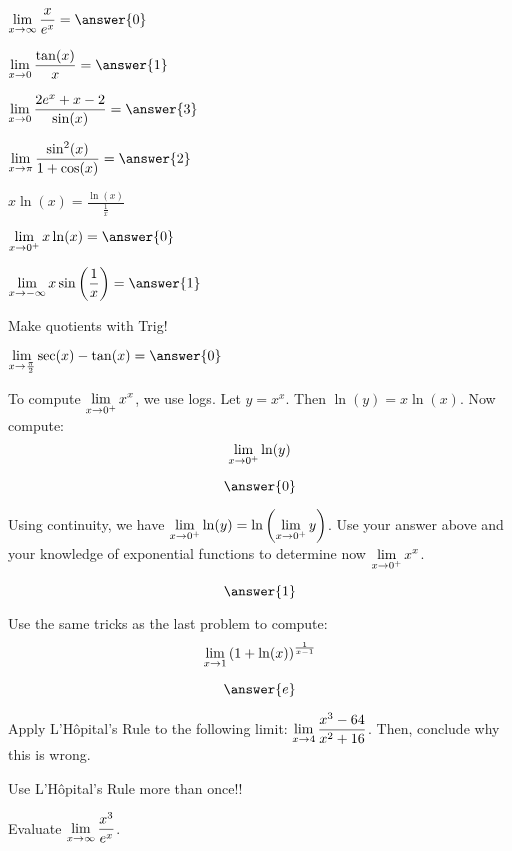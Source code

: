 \documentclass{ximera}
\begin{document}
    \begin{problem}
     $\dlim_{x \to \infty} \df{x}{e^x} = \answer{0}$
    \end{problem}
    \begin{problem}
     $\dlim_{x \to 0} \df{\tan(x)}{x} = \answer{1}$
    \end{problem}
    \begin{problem}
     $\dlim_{x \to 0} \df{2e^x + x - 2}{\sin(x)} = \answer{3}$
    \end{problem}
    \begin{problem}
     $\dlim_{x \to \pi} \df{\sin^2(x)}{1+\cos(x)} = \answer{2}$
    \end{problem}
    \begin{problem}
    \begin{hint}
    $x\ln(x) = \frac{\ln(x)}{\frac{1}{x}}$
    \end{hint}
    $\dlim_{x \to 0^+} x \ln(x) = \answer{0}$
    \end{problem}
    \begin{problem}
    $\dlim_{x \to -\infty} x\sin\left(\frac{1}{x}\right) = \answer{1}$
    \end{problem}
    \begin{problem}
    \begin{hint}
    Make quotients with Trig!
    \end{hint}
    $\dlim_{x \to \frac{\pi}{2}} \sec(x) - \tan(x) = \answer{0}$
    \end{problem}

    \begin{problem}
    To compute $\displaystyle \lim_{x \to 0^+} x^x$, we use logs. Let $y=x^x$. Then $\ln(y) = x \ln(x)$. Now compute:
    \[
        \displaystyle \lim_{x \to 0^+} \ln(y)
    \]


    $$\answer{0}$$


    Using continuity, we have $\displaystyle \lim_{x \to 0^+} \ln(y) = \ln\left(\displaystyle \lim_{x \to 0^+} y\right)$. Use your answer above and your knowledge of exponential functions to determine now $\displaystyle \lim_{x \to 0^+} x^x$.

    $$\answer{1}$$

    \end{problem}

    \begin{problem}
Use the same tricks as the last problem to compute:
        \[
            \displaystyle \lim_{x \to 1} \left(1+\ln(x)\right)^{\frac{1}{x-1}}
        \]

    $$\answer{e}$$
     \end{problem}

     \begin{problem}
     Apply L'H\^{o}pital's Rule to the following limit: $\displaystyle \lim_{x \to 4} \displaystyle\frac{x^3 - 64}{x^2+16}$. Then, conclude why this is wrong.
\end{problem}

\begin{problem}
\begin{hint}
Use L'H\^{o}pital's Rule more than once!!
\end{hint}
Evaluate $\displaystyle \lim_{x \to \infty} \displaystyle\frac{x^3}{e^x}$.
\end{problem}
\end{document}
